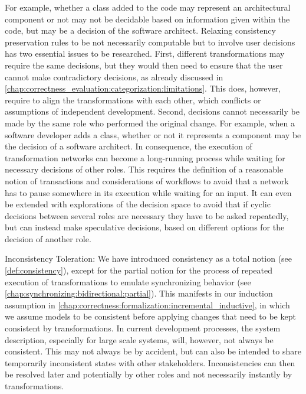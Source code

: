 \begin{properdescription}
For example, whether a class added to the code may represent an architectural component or not may not be decidable based on information given within the code, but may be a decision of the software architect.
Relaxing consistency preservation rules to be not necessarily computable but to involve user decisions has two essential issues to be researched.
First, different transformations may require the same decisions, but they would then need to ensure that the user cannot make contradictory decisions, as already discussed in \autoref{chap:correctness_evaluation:categorization:limitations}.
This does, however, require to align the transformations with each other, which conflicts or assumptions of independent development.
Second, decisions cannot necessarily be made by the same role who performed the original change.
For example, when a software developer adds a class, whether or not it represents a component may be the decision of a software architect.
In consequence, the execution of transformation networks can become a long-running process while waiting for necessary decisions of other roles.
This requires the definition of a reasonable notion of transactions and considerations of workflows to avoid that a network has to pause somewhere in its execution while waiting for an input.
It can even be extended with explorations of the decision space to avoid that if cyclic decisions between several roles are necessary they have to be asked repeatedly, but can instead make speculative decisions, based on different options for the decision of another role.
\item[Inconsistency Toleration:]
We have introduced consistency as a total notion (see \autoref{def:consistency}), except for the partial notion for the process of repeated execution of transformations to emulate synchronizing behavior (see \autoref{chap:synchronizing:bidirectional:partial}).
This manifests in our induction assumption in \autoref{chap:correctness:formalization:incremental_inductive}, in which we assume models to be consistent before applying changes that need to be kept consistent by transformations.
In current development processes, the system description, especially for large scale systems, will, however, not always be consistent.
This may not always be by accident, but can also be intended to share temporarily inconsistent states with other stakeholders. 
Inconsistencies can then be resolved later and potentially by other roles and not necessarily instantly by transformations.

\end{properdescription}
